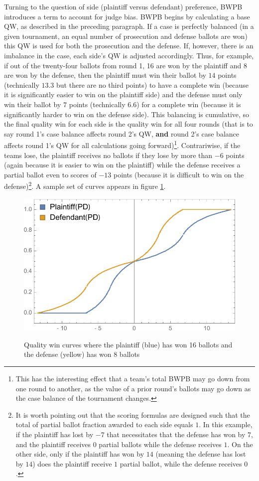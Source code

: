 \documentclass{article}
\begin{document}
Turning to the question of side (plaintiff versus defendant) preference, BWPB introduces a term to account for judge bias.  BWPB begins by calculating a base QW, as described in the preceding paragraph.  If a case is perfectly balanced (in a given tournament, an equal number of prosecution and defense ballots are won) this QW is used for both the prosecution and the defense.  If, however, there is an imbalance in the case, each side's QW is adjusted accordingly.  Thus, for example, if out of the twenty-four ballots from round 1, 16 are won by the plaintiff and 8 are won by the defense, then the plaintiff must win their ballot by $14$ points (technically $13.3$ but there are no third points) to have a complete win (because it is significantly easier to win on the plaintiff side) and the defense must only win their ballot by $7$ points (technically 6.6) for a complete win (because it is significantly harder to win on the defense side).  This balancing is cumulative, so the final quality win for each side is the quality win for all four rounds (that is to say round 1's case balance affects round 2's QW, \textbf{and} round 2's case balance affects round 1's QW for all calculations going forward)\footnote{This has the interesting effect that a team's total BWPB may go down from one round to another, as the value of a prior round's ballots may go down as the case balance of the tournament changes.}.  Contrariwise, if the teams lose, the plaintiff receives no ballots if they lose by more than $-6$ points (again because it is easier to win on the plaintiff) while the defense receives a partial ballot even to scores of $-13$ points (because it is difficult to win on the defense)\footnote{It is worth pointing out that the scoring formulas are designed such that the total of partial ballot fraction awarded to each side equals $1$.  In this example, if the plaintiff has lost by $-7$ that necessitates that the defense has won by $7$, and the plaintiff receives $0$ partial ballots while the defense receives $1$.  On the other side, only if the plaintiff has won by $14$ (meaning the defense has lost by $14$) does the plaintiff receive $1$ partial ballot, while the defense receives $0$.}.  A sample set of curves appears in figure \ref{balancingCurve}.
\begin{figure}
\begin{center}
\label{balancingCurve}
\includegraphics[width=0.8\linewidth]{BalancingCurve}
\caption{Quality win curves where the plaintiff (blue) has won 16 ballots and the defense (yellow) has won 8 ballots}
\end{center}
\end{figure}
\end{document}
